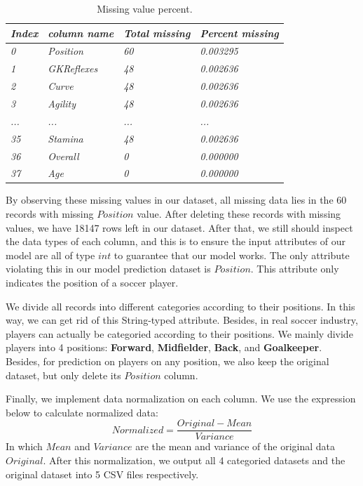\documentclass{article}
\begin{document}
\begin{table}[]
\centering
\begin{tabular}{|l|l|l|l|}
\hline
\textit{Index} & \textit{column name}          & \textit{Total missing} & \textit{Percent missing} \\ \hline
\textit{0}     & \textit{Position}             & \textit{60}            & \textit{0.003295}        \\ \hline
\textit{1}     & \textit{GKReflexes}           & \textit{48}            & \textit{0.002636}        \\ \hline
\textit{2}     & \textit{Curve}                & \textit{48}            & \textit{0.002636}        \\ \hline
\textit{3}     & \textit{Agility}              & \textit{48}            & \textit{0.002636}        \\ \hline
\textit{...}   & \textit{...}                  & \textit{...}           & \textit{...}             \\ \hline
\textit{35}    & \textit{Stamina}              & \textit{48}            & \textit{0.002636}        \\ \hline
\textit{36}    & \textit{Overall}              & \textit{0}             & \textit{0.000000}        \\ \hline
\textit{37}    & \textit{Age}                  & \textit{0}             & \textit{0.000000}        \\ \hline
\end{tabular}
\caption{Missing value percent.}
\end{table}

\par By observing these missing values in our dataset, all missing data lies in the 60 records with missing $Position$ value. After deleting these records with missing values, we have 18147 rows left in our dataset. After that, we still should inspect the data types of each column, and this is to ensure the input attributes of our model are all of type $int$ to guarantee that our model works. The only attribute violating this in our model prediction dataset is $Position$. This attribute only indicates the position of a soccer player.
\par We divide all records into different categories according to their positions. In this way, we can get rid of this String-typed attribute. Besides, in real soccer industry, players can actually be categoried according to their positions. We mainly divide players into 4 positions: \textbf{Forward}, \textbf{Midfielder}, \textbf{Back}, and \textbf{Goalkeeper}. Besides, for prediction on players on any position, we also keep the original dataset, but only delete its $Position$ column.
\par Finally, we implement data normalization on each column. We use the expression below to calculate normalized data:
$$Normalized = \frac{Original-Mean}{Variance}$$
In which $Mean$ and $Variance$ are the mean and variance of the original data $Original$. After this normalization, we output all 4 categoried datasets and the original dataset into 5 CSV files respectively.
\end{document}
